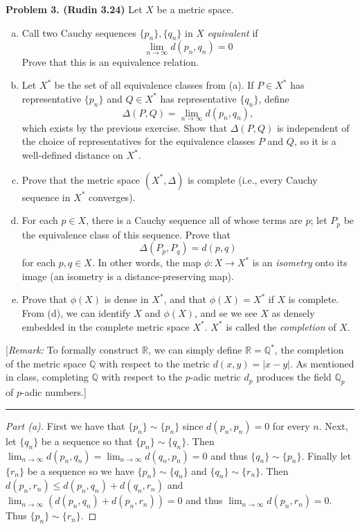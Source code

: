 \documentclass[leqno]{article}
\theoremstyle{nonumberplain}
\newtheorem{proof}{Proof}
\begin{document}
\pagebreak




\noindent\textbf{Problem 3. (Rudin 3.24)} Let $X$ be a metric space.
\begin{enumerate}[(a)]
\item Call two Cauchy sequences $\{p_n\}, \{q_n\}$ in $X$ \emph{equivalent} if
\[
\lim_{n\to \infty} d(p_n,q_n)=0
\]
Prove that this is an equivalence relation.
\item Let $X^*$ be the set of all equivalence classes from (a). If $P\in X^*$ has representative $\{p_n\}$ and $Q\in X^*$ has representative $\{q_n\}$, define
\[
\Delta(P,Q)=\lim_{n\to \infty} d(p_n,q_n),
\]
which exists by the previous exercise. Show that $\Delta(P,Q)$ is independent of the choice of representatives for the equivalence classes $P$ and $Q$, so it is a well-defined distance on $X^*$.
\item Prove that the metric space $(X^*,\Delta)$ is complete (i.e., every Cauchy sequence in $X^*$ converges).
\item For each $p\in X$, there is a Cauchy sequence all of whose terms are $p$; let $P_p$ be the equivalence class of this sequence. Prove that 
\[
\Delta(P_p,P_q)=d(p,q)
\]
for each $p,q\in X$. In other words, the map $\phi \colon X \to X^*$ is an \emph{isometry} onto its image (an isometry is a distance-preserving map).
\item Prove that $\phi(X)$ is dense in $X^*$, and that $\phi(X)=X^*$ if $X$ is complete. From (d), we can identify $X$ and $\phi(X)$, and se we see $X$ as densely embedded in the complete metric space $X^*$. $X^*$ is called the \emph{completion} of $X$.
\end{enumerate}
[\emph{Remark:} To formally construct $\mathbb{R}$, we can simply define $\mathbb{R}=\mathbb{Q}^*$, the completion of the metric space $\mathbb{Q}$ with respect to the metric $d(x,y)=|x-y|$. As mentioned in class, completing $\mathbb{Q}$ with respect to the $p$-adic metric $d_p$ produces the field $\mathbb{Q}_p$ of $p$-adic numbers.]

\noindent\rule[0.5ex]{\linewidth}{1pt}

\begin{proof}[Part (a)]
First we have that $\{p_n\}\sim \{p_n\}$ since $d(p_n,p_n)=0$ for every $n$.  Next, let $\{q_n\}$ be a sequence so that $\{p_n\}\sim \{q_n\}$. Then $\lim_{n\to \infty}d(p_n,q_n)=\lim_{n\to \infty}d(q_n,p_n)=0$ and thus $\{q_n\}\sim \{p_n\}$.  Finally let $\{r_n\}$ be a sequence so we have $\{p_n\}\sim \{q_n\}$ and $\{q_n\}\sim \{r_n\}$. Then $d(p_n,r_n)\le d(p_n,q_n)+d(q_n,r_n)$ and $\lim_{n\to \infty}(d(p_n,q_n)+d(p_n,r_n))=0$ and thus $\lim_{n\to \infty}d(p_n,r_n)=0$.  Thus $\{p_n\}\sim \{r_n\}$.
\end{proof}
\end{document}
